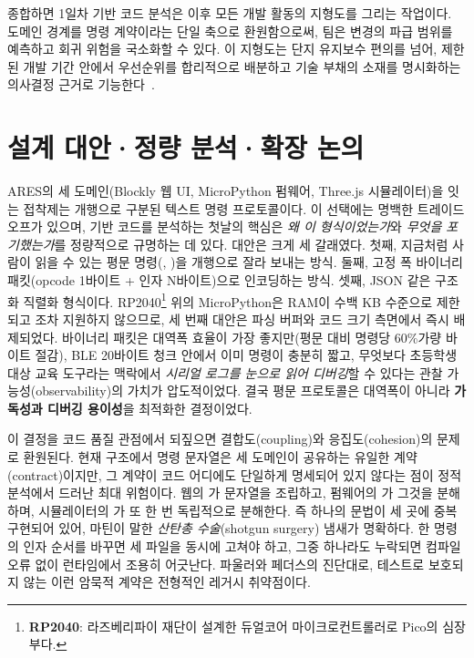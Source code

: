 종합하면 1일차 기반 코드 분석은 이후 모든 개발 활동의 지형도를 그리는 작업이다. 도메인 경계를 명령 계약이라는 단일 축으로 환원함으로써, 팀은 변경의 파급 범위를 예측하고 회귀 위험을 국소화할 수 있다. 이 지형도는 단지 유지보수 편의를 넘어, 제한된 개발 기간 안에서 우선순위를 합리적으로 배분하고 기술 부채의 소재를 명시화하는 의사결정 근거로 기능한다~\cite{mcconnell2004codecomplete, hunt1999pragmatic}.





\section{설계 대안·정량 분석·확장 논의}

ARES의 세 도메인(Blockly 웹 UI, MicroPython 펌웨어, Three.js 시뮬레이터)을 잇는 접착제는 개행으로 구분된 텍스트 명령 프로토콜이다. 이 선택에는 명백한 트레이드오프가 있으며, 기반 코드를 분석하는 첫날의 핵심은 \emph{왜 이 형식이었는가}와 \emph{무엇을 포기했는가}를 정량적으로 규명하는 데 있다. 대안은 크게 세 갈래였다. 첫째, 지금처럼 사람이 읽을 수 있는 평문 명령(, )을 개행으로 잘라 보내는 방식. 둘째, 고정 폭 바이너리 패킷(opcode 1바이트 + 인자 N바이트)으로 인코딩하는 방식. 셋째, JSON 같은 구조화 직렬화 형식이다. RP2040\footnote{\textbf{RP2040}: 라즈베리파이 재단이 설계한 듀얼코어 마이크로컨트롤러로 Pico의 심장부다.}\cite{rp2040} 위의 MicroPython\cite{micropython}은 RAM이 수백 KB 수준으로 제한되고 조차 지원하지 않으므로, 세 번째 대안은 파싱 버퍼와 코드 크기 측면에서 즉시 배제되었다. 바이너리 패킷은 대역폭 효율이 가장 좋지만(평문 대비 명령당 60\%가량 바이트 절감), BLE 20바이트 청크\cite{webbluetooth} 안에서 이미 명령이 충분히 짧고, 무엇보다 초등학생 대상 교육 도구라는 맥락에서 \emph{시리얼 로그를 눈으로 읽어 디버깅}할 수 있다는 관찰 가능성(observability)의 가치가 압도적이었다. 결국 평문 프로토콜은 대역폭이 아니라 \textbf{가독성과 디버깅 용이성}을 최적화한 결정이었다.

이 결정을 코드 품질 관점에서 되짚으면 결합도(coupling)와 응집도(cohesion)의 문제로 환원된다. 현재 구조에서 명령 문자열은 세 도메인이 공유하는 유일한 계약(contract)이지만, 그 계약이 코드 어디에도 단일하게 명세되어 있지 않다는 점이 정적 분석에서 드러난 최대 위험이다. 웹의 가 문자열을 조립하고, 펌웨어의 가 그것을 분해하며, 시뮬레이터의 가 또 한 번 독립적으로 분해한다. 즉 하나의 문법이 세 곳에 중복 구현되어 있어, 마틴이 말한 \emph{산탄총 수술}(shotgun surgery) 냄새\cite{fowler2018refactoring}가 명확하다. 한 명령의 인자 순서를 바꾸면 세 파일을 동시에 고쳐야 하고, 그중 하나라도 누락되면 컴파일 오류 없이 런타임에서 조용히 어긋난다. 파울러와 페더스의 진단대로, 테스트로 보호되지 않는 이런 암묵적 계약은 전형적인 레거시 취약점\cite{feathers2004legacy}이다.

